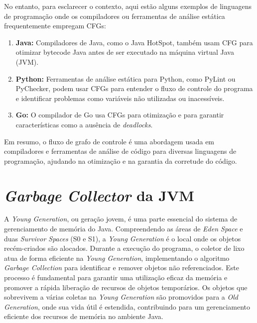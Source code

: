 \documentclass{article}
\begin{document}
    No entanto, para esclarecer o contexto, aqui estão alguns exemplos de linguagens de programação onde os
    compiladores ou ferramentas de análise estática frequentemente empregam CFGs:

    \begin{enumerate}
        \item \textbf{Java:} Compiladores de Java, como o Java HotSpot, também usam CFG para otimizar bytecode Java antes
        de ser executado na máquina virtual Java (JVM).

        \item \textbf{Python:} Ferramentas de análise estática para Python, como PyLint ou PyChecker, podem usar CFGs para entender
        o fluxo de controle do programa e identificar problemas como variáveis não utilizadas ou inacessíveis.

        \item \textbf{Go:} O compilador de Go usa CFGs para otimização e para garantir características como a ausência de
        \emph{deadlocks}.
    \end{enumerate}

    Em resumo, o fluxo de grafo de controle é uma abordagem usada em compiladores e ferramentas de análise de código
    para diversas linguagens de programação, ajudando na otimização e na garantia da corretude do código.

    \section*{\emph{Garbage Collector} da JVM}

    A \emph{Young Generation}, ou geração jovem, é uma parte essencial do sistema de gerenciamento de memória do Java.
    Compreendendo as áreas de \emph{Eden Space} e duas \emph{Survivor Spaces} (S0 e S1), a \emph{Young Generation} é o local onde os objetos
    recém-criados são alocados. Durante a execução do programa, o coletor de lixo atua de forma eficiente na \emph{Young Generation},
    implementando o algoritmo \emph{Garbage Collection} para identificar e remover objetos não referenciados. Este processo é
    fundamental para garantir uma utilização eficaz da memória e promover a rápida liberação de recursos de objetos temporários.
    Os objetos que sobrevivem a várias coletas na \emph{Young Generation} são promovidos para a \emph{Old Generation}, onde sua vida útil é
    estendida, contribuindo para um gerenciamento eficiente dos recursos de memória no ambiente Java.
\end{document}
